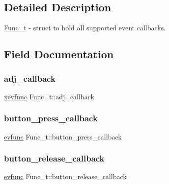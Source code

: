 \subsection{Detailed Description}
\hyperlink{structFunc__t}{Func\+\_\+t} -\/ struct to hold all supported event callbacks. 

\subsection{Field Documentation}
\mbox{\label{structFunc__t_afe804d94b970050a9f85530408169623}} 
\subsubsection{\texorpdfstring{adj\+\_\+callback}{adj\_callback}}
{\footnotesize\ttfamily \hyperlink{xwidget_8h_a9ef0263424a7f5f8f6b02055fca67ddd}{xevfunc} Func\+\_\+t\+::adj\+\_\+callback}

\mbox{\label{structFunc__t_aa58bc35a1499d8cd850d2a083ad016f1}} 
\subsubsection{\texorpdfstring{button\+\_\+press\+\_\+callback}{button\_press\_callback}}
{\footnotesize\ttfamily \hyperlink{xwidget_8h_ab4ae973f86a383c8c0f92b709044520a}{evfunc} Func\+\_\+t\+::button\+\_\+press\+\_\+callback}

\mbox{\label{structFunc__t_a8cb9d8135a178027675c96599ff8312e}} 
\subsubsection{\texorpdfstring{button\+\_\+release\+\_\+callback}{button\_release\_callback}}
{\footnotesize\ttfamily \hyperlink{xwidget_8h_ab4ae973f86a383c8c0f92b709044520a}{evfunc} Func\+\_\+t\+::button\+\_\+release\+\_\+callback}


